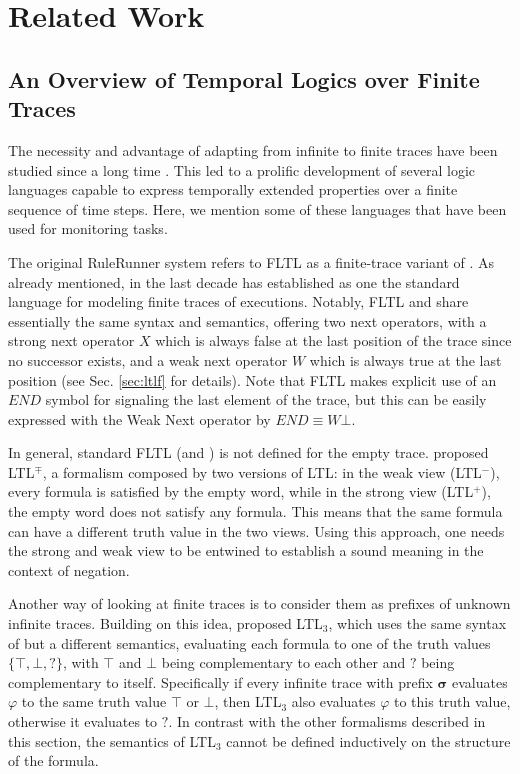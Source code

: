 \section{Related Work}

\subsection{An Overview of Temporal Logics over Finite Traces}
\label{sec:overview}

The necessity and advantage of adapting \ltl from infinite to finite traces have been studied since a long time \cite{lichtenstein1985glory,manna1995temporal}. This led to a prolific development of several logic languages capable to express temporally extended properties over a finite sequence of time steps. Here, we mention some of these languages that have been used for monitoring tasks.

The original RuleRunner system \cite{perotti2015runtime} refers to FLTL as a finite-trace variant of \ltl. As already mentioned, in the last decade \ltlf \cite{de2013linear,GiacomoV15,CamachoBM19} has established as one the standard language for modeling finite traces of executions. Notably, FLTL and \ltlf share essentially the same syntax and semantics, offering two next operators, with a strong next operator $X$ which is always false at the last position of the trace since no successor exists, and a weak next operator $W$ which is always true at the last position (see Sec. \ref{sec:ltlf} for details).
Note that FLTL makes explicit use of an $\textit{END}$ symbol for signaling the last element of the trace, but this can be easily expressed with the Weak Next operator by $\textit{END} \equiv W  \bot$.

In general, standard FLTL (and \ltlf) is not defined for the empty trace. \cite{eisner2003reasoning} proposed LTL$^\mp$, a formalism composed by two versions of LTL: in the weak view (LTL$^-$), every formula is satisfied by the empty word, while in the strong view (LTL$^+$), the empty word does not satisfy any formula. This means that the same formula can have a different truth value in the two views. Using this approach, one needs the strong and weak view to be entwined to establish a sound meaning in the context of negation. 

Another way of looking at finite traces is to consider them as prefixes of unknown infinite traces. Building on this idea, \cite{arafat2005runtime,bauer2006monitoring} proposed LTL$_3$, which uses the same syntax of \ltlf but a different semantics, evaluating each formula to one of the truth values $\{ \top, \bot, ? \}$, with $\top$ and $\bot$ being complementary to each other and $?$ being complementary to itself. Specifically if every infinite trace with prefix $\boldsymbol{\sigma}$ evaluates $\varphi$ to the same truth value $\top$ or $\bot$, then LTL$_3$ also evaluates $\varphi$ to this truth value, otherwise it evaluates to $?$. In contrast with the other formalisms described in this section, the semantics of LTL$_3$ cannot be defined inductively on the structure of the formula.

